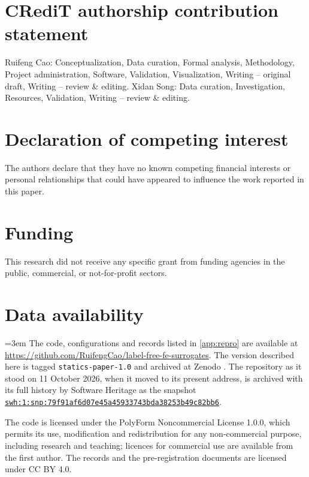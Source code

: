 \section*{CRediT authorship contribution statement}

Ruifeng Cao: Conceptualization, Data curation, Formal analysis, Methodology, Project
administration, Software, Validation, Visualization, Writing -- original draft, Writing --
review \& editing. Xidan Song: Data curation, Investigation, Resources, Validation,
Writing -- review \& editing.

\section*{Declaration of competing interest}

The authors declare that they have no known competing financial interests or personal
relationships that could have appeared to influence the work reported in this paper.

\section*{Funding}

This research did not receive any specific grant from funding agencies in the public,
commercial, or not-for-profit sectors.

\section*{Data availability}

{\emergencystretch=3em
The code, configurations and records listed in \ref{app:repro} are available at
\url{https://github.com/RuifengCao/label-free-fe-surrogates}. The version described here is
tagged \texttt{statics-paper-1.0} and archived at Zenodo \cite{Cao2026Zenodo}.
The repository as it stood on 11 October 2026,
when it moved to its present address, is archived with its full history by Software Heritage
as the snapshot
\href{https://archive.softwareheritage.org/swh:1:snp:79f91af6d07e45a45933743bda38253b49c82bb6}{\nolinkurl{swh:1:snp:79f91af6d07e45a45933743bda38253b49c82bb6}}.\par}

The code is licensed under the PolyForm Noncommercial License 1.0.0, which permits its
use, modification and redistribution for any non-commercial purpose, including research
and teaching; licences for commercial use are available from the first author. The records
and the pre-registration documents are licensed under CC BY 4.0.


